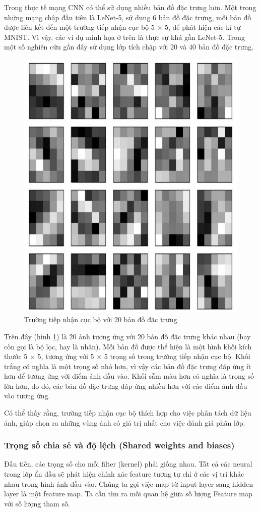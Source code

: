 Trong thực tế mạng CNN có thể sử dụng nhiều bản đồ đặc trưng hơn. Một trong những mạng chập đầu tiên là LeNet-5, sử dụng 6 bản đồ đặc trưng, mỗi bản đồ được liên kết đến một trường tiếp nhận cục bộ 5 × 5, để phát hiện các kí tự MNIST. Vì vậy, các ví dụ minh họa ở trên là thực sự khá gần LeNet-5. Trong một số nghiên cứu gần đây sử dụng lớp tích chập với 20 và 40 bản đồ đặc trưng.
\begin{figure}[H]
	\centering
	\includegraphics[width=0.8\linewidth]{images/20bandodactrung.png}
	\caption{Trường tiếp nhận cục bộ với 20 bản đồ đặc trưng}
	\label{fig:20bandodactrung}
\end{figure}
Trên đây (hình \ref{fig:20bandodactrung}) là 20 ảnh tương ứng với 20 bản đồ đặc trưng khác nhau (hay còn gọi là bộ lọc, hay là nhân). Mỗi bản đồ được thể hiện là một hình khối kích thước 5 × 5, tương ứng với 5 × 5 trọng số trong trường tiếp nhận cục bộ. Khối trắng có nghĩa là một trọng số nhỏ hơn, vì vậy các bản đồ đặc trưng đáp ứng ít hơn để tương ứng với điểm ảnh đầu vào. Khối sẫm màu hơn có nghĩa là trọng số lớn hơn, do đó, các bản đồ đặc trưng đáp ứng nhiều hơn với các điểm ảnh đầu vào tương ứng.

Có thể thấy rằng, trường tiếp nhận cục bộ thích hợp cho việc phân tách dữ liệu ảnh, giúp chọn ra những vùng ảnh có giá trị nhất cho việc đánh giá phân lớp.

\subsubsection{Trọng số chia sẻ và độ lệch (Shared weights and biases)}
Đầu tiên, các trọng số cho mỗi filter (kernel) phải giống nhau. Tất cả các neural trong lớp ẩn đầu sẽ phát hiện chính xác feature tương tự chỉ ở các vị trí khác nhau trong hình ảnh đầu vào. Chúng ta gọi việc map từ input layer sang hidden layer là một feature map. Ta cần tìm ra mối quan hệ giữa số lượng Feature map với số lượng tham số.

